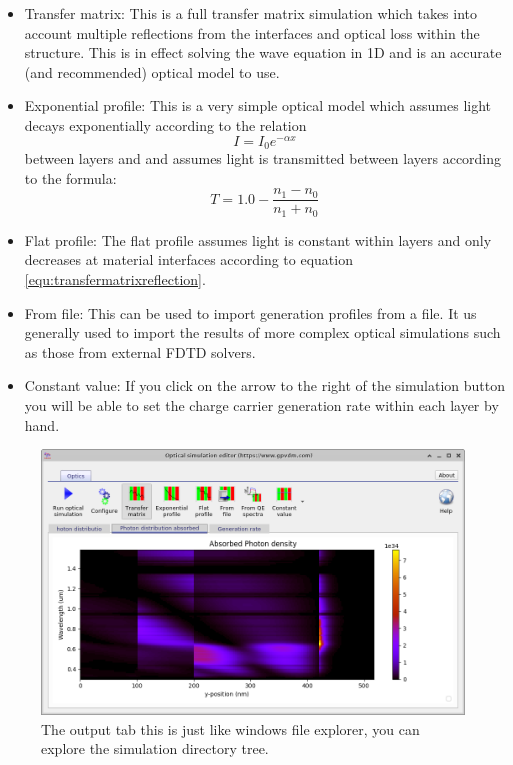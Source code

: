 \begin{itemize}
  \item Transfer matrix: This is a full transfer matrix simulation which takes into account multiple reflections from the interfaces and optical loss within the structure. This is in effect solving the wave equation in 1D and is an accurate (and recommended) optical model to use.

  \item Exponential profile: This is a very simple optical model which assumes light decays exponentially according to the relation
\begin{equation}
I=I_{0}e^{-\alpha x}
\label{efield2}
\end{equation}
between layers and and assumes light is transmitted between layers according to the formula:
\begin{equation}
T=1.0-\frac{n_1-n_0}{n_1+n_0}
\label{equ:transfermatrixreflection}
\end{equation}
  \item Flat profile: The flat profile assumes light is constant within layers and only decreases at material interfaces according to equation \ref{equ:transfermatrixreflection}.

  \item From file: This can be used to import generation profiles from a file. It us generally used to import the results of more complex optical simulations such as those from external FDTD solvers.
  \item Constant value: If you click on the arrow to the right of the simulation button you will be able to set the charge carrier generation rate within each layer by hand.
\end{itemize}

\begin{figure}[H]
\centering
\includegraphics[width=1.0\textwidth,height=0.6\textwidth]{./images/opticalsimulation4.png}
\caption{The output tab this is just like windows file explorer, you can explore the simulation directory tree.}
\label{fig:transfermatrix0}
\end{figure}

